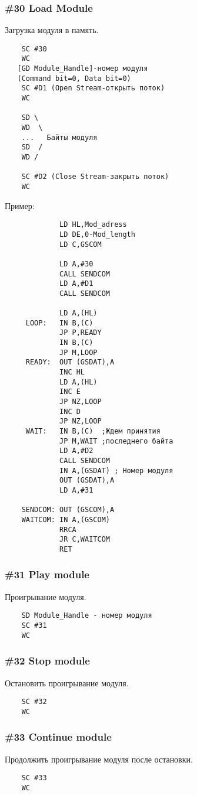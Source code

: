 \documentclass[a4paper,11pt]{article}
\begin{document}
\subsubsection{\#30 Load Module}
Загрузка модуля в память.
\begin{verbatim}
    SC #30
    WC
   [GD Module_Handle]-номер модуля
   (Command bit=0, Data bit=0)
    SC #D1 (Open Stream-открыть поток)
    WC

    SD \
    WD  \
    ...   Байты модуля
    SD  /
    WD /

    SC #D2 (Close Stream-закрыть поток)
    WC
\end{verbatim}

Пример:
\begin{verbatim}
             LD HL,Mod_adress
             LD DE,0-Mod_length
             LD C,GSCOM

             LD A,#30
             CALL SENDCOM
             LD A,#D1
             CALL SENDCOM

             LD A,(HL)
     LOOP:   IN B,(C)
             JP P,READY
             IN B,(C)
             JP M,LOOP
     READY:  OUT (GSDAT),A
             INC HL
             LD A,(HL)
             INC E
             JP NZ,LOOP
             INC D
             JP NZ,LOOP
     WAIT:   IN B,(C)  ;Ждем принятия
             JP M,WAIT ;последнего байта
             LD A,#D2
             CALL SENDCOM
             IN A,(GSDAT) ; Номер модуля
             OUT (GSDAT),A
             LD A,#31

    SENDCOM: OUT (GSCOM),A
    WAITCOM: IN A,(GSCOM)
             RRCA
             JR C,WAITCOM
             RET
\end{verbatim}

\subsubsection{\#31 Play module}
Проигрывание модуля.
\begin{verbatim}
    SD Module_Handle - номер модуля
    SC #31
    WC
\end{verbatim}

\subsubsection{\#32 Stop module}
Остановить проигрывание модуля.
\begin{verbatim}
    SC #32
    WC
\end{verbatim}

\subsubsection{\#33 Continue module}
Продолжить проигрывание модуля после остановки.
\begin{verbatim}
    SC #33
    WC
\end{verbatim}
\end{document}
